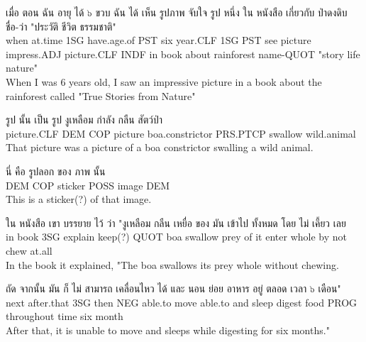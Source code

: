 \documentclass{book}
\begin{document}
	\begin{exe}
		\ex
		\gll เมื่อ ตอน ฉัน อายุ ได้ ๖ ขวบ ฉัน ได้ เห็น รูปภาพ จับใจ รูป หนึ่ง ใน หนังสือ เกี่ยวกับ ป่าดงดิบ ชื่อ-ว่า "ประวัติ ชีวิต ธรรมชาติ" \\
		 when at.time 1\textsc{SG} have.age.of \textsc{PST} six year.\textsc{CLF} 1\textsc{SG} \textsc{PST} see picture impress.\textsc{ADJ} picture.\textsc{CLF} \textsc{INDF} in book about rainforest name-\textsc{QUOT} "story life nature"\\
		\glt  When I was 6 years old, I saw an impressive picture in a book about the rainforest called "True Stories from Nature"
	\end{exe}

	\begin{exe}
	\ex
		\gll รูป นั้น เป็น รูป งูเหลือม กำลัง กลืน สัตว์ป่า \\
		picture.\textsc{CLF} \textsc{DEM} COP picture boa.constrictor \textsc{PRS}.\textsc{PTCP} swallow  wild.animal\\
		\glt  That picture was a picture of a boa constrictor swalling a wild animal.
	\end{exe}

	\begin{exe}
		\ex
		\gll นี่ คือ รูปลอก ของ ภาพ นั้น \\
		\textsc{DEM} \textsc{COP} sticker \textsc{POSS} image \textsc{DEM} \\
		\glt  This is a sticker(?) of that image.
	\end{exe}

	\begin{exe}
		\ex
		\gll ใน หนังสือ เขา บรรยาย ไว้ ว่า "งูเหลือม กลืน เหยื่อ ของ มัน เข้าไป ทั้งหมด โดย ไม่ เคี้ยว เลย\\
		in book \textsc{3SG} explain keep(?) \textsc{QUOT} boa swallow prey of it enter whole by not chew at.all\\
		\glt  In the book it explained, "The boa swallows its prey whole without chewing.
	\end{exe}

	\begin{exe}
		\ex
		\gll ถัด จากนั้น มัน ก็ ไม่ สามารถ เคลื่อนไหว ได้ และ นอน ย่อย อาหาร อยู่ ตลอด เวลา ๖ เดือน"\\
		next after.that \textsc{3SG} then \textsc{NEG} able.to move able.to and sleep digest food \textsc{PROG} throughout time six month\\
		\glt  After that, it is unable to move and sleeps while digesting for six months." 
	\end{exe}
\end{document}
